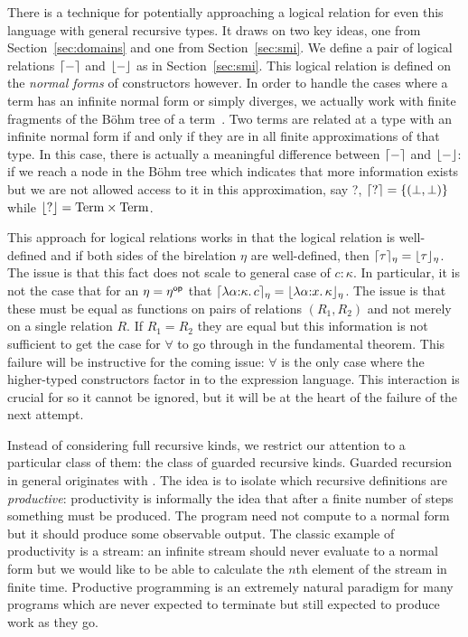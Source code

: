 There is a technique for potentially approaching a logical relation
for even this language with general recursive types. It draws on two
key ideas, one from Section~\ref{sec:domains} and one from
Section~\ref{sec:smi}. We define a pair of logical relations
$\lceil - \rceil$ and $\lfloor - \rfloor$ as in Section~\ref{sec:smi}. This
logical relation is defined on the \emph{normal forms} of
constructors however. In order to handle the cases where a term has an
infinite normal form or simply diverges, we actually work with finite
fragments of the B\"ohm tree of a term~\citep{Barendregt:13}. Two terms
are related at a type with an infinite normal form if and only if they
are in all finite approximations of that type. In this case, there is
actually a meaningful difference between $\lceil - \rceil$ and
$\lfloor - \rfloor$: if we reach a node in the B\"ohm tree which indicates
that more information exists but we are not allowed access to it in
this approximation, say ?, $\lceil ? \rceil = \{(\bot, \bot)\}$ while
$\lfloor ? \rfloor = \mathrm{Term} \times \mathrm{Term}$.

This approach for logical relations works in that the logical relation
is well-defined and if both sides of the birelation $\eta$ are
well-defined, then $\lceil \tau \rceil_\eta =
\lfloor \tau \rfloor_\eta$. The issue is that this fact does not scale to
general case of $c : \kappa$. In particular, it is not the case that
for an $\eta = \eta^{\mathsf{op}}$ that
$\lceil \lambda \alpha {:} \kappa.\, c \rceil_\eta = \lfloor \lambda \alpha {:} x.\, \kappa \rfloor_\eta$.
The issue is that these must be equal as functions on pairs of
relations $(R_1, R_2)$ and not merely on a single relation $R$. If
$R_1 = R_2$ they are equal but this information is not sufficient to
get the case for $\forall$ to go through in the fundamental
theorem. This failure will be instructive for the coming issue:
$\forall$ is the only case where the higher-typed constructors factor
in to the expression language. This interaction is crucial for
\citet{Pottier:11} so it cannot be ignored, but it will be at the
heart of the failure of the next attempt.

Instead of considering full recursive kinds, we restrict our attention
to a particular class of them: the class of guarded recursive
kinds. Guarded recursion in general originates with
\citet{Nakano:00}. The idea is to isolate which recursive definitions
are \emph{productive}: productivity is informally the idea that after
a finite number of steps something must be produced. The program need
not compute to a normal form but it should produce some observable
output. The classic example of productivity is a stream: an infinite
stream should never evaluate to a normal form but we would like to be
able to calculate the $n$th element of the stream in finite
time. Productive programming is an extremely natural paradigm for many
programs which are never expected to terminate but still expected to
produce work as they go.

